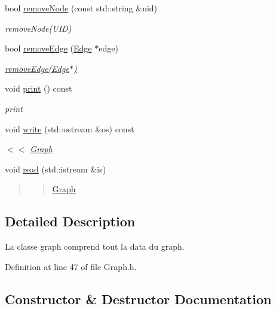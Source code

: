 \begin{DoxyCompactItemize}
bool \mbox{\hyperlink{class_graph_a1c30c580ccc957167dc64ca1a9e19248}{remove\+Node}} (const std\+::string \&uid)
\begin{DoxyCompactList}\small\item\em remove\+Node(\+U\+I\+D) \end{DoxyCompactList}\item 
bool \mbox{\hyperlink{class_graph_a97b5c94aeef2c0bea6a3f424b0fc01b8}{remove\+Edge}} (\mbox{\hyperlink{class_edge}{Edge}} $\ast$edge)
\begin{DoxyCompactList}\small\item\em \mbox{\hyperlink{class_graph_a97b5c94aeef2c0bea6a3f424b0fc01b8}{remove\+Edge(\+Edge$\ast$)}} \end{DoxyCompactList}\item 
void \mbox{\hyperlink{class_graph_aeeede3cb48be5d8cac08ea05ce54bd52}{print}} () const
\begin{DoxyCompactList}\small\item\em print \end{DoxyCompactList}\item 
void \mbox{\hyperlink{class_graph_aada8884f6aea111f9b36d8dfb3e5c0a9}{write}} (std\+::ostream \&os) const
\begin{DoxyCompactList}\small\item\em $<$$<$ \mbox{\hyperlink{class_graph}{Graph}} \end{DoxyCompactList}\item 
void \mbox{\hyperlink{class_graph_a79b39cf3963c03095bb74017a23c145e}{read}} (std\+::istream \&is)
\begin{DoxyCompactList}\small\item\em \begin{quote}
\begin{quote}
\mbox{\hyperlink{class_graph}{Graph}}\end{quote}
\end{quote}
\end{DoxyCompactList}\end{DoxyCompactItemize}


\subsection{Detailed Description}
La classe graph comprend tout la data du graph. 

Definition at line 47 of file Graph.\+h.



\subsection{Constructor \& Destructor Documentation}
\mbox{\label{class_graph_ae4c72b8ac4d693c49800a4c7e273654f}} 
